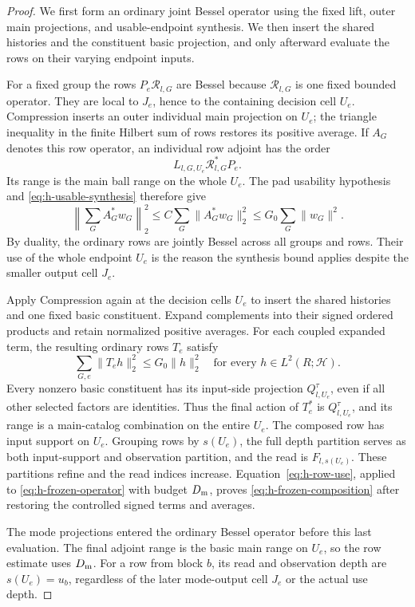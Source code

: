 \begin{proof}
We first form an ordinary joint Bessel operator using the fixed
lift, outer main projections, and usable-endpoint synthesis.
We then insert the shared histories and the constituent basic
projection, and only afterward evaluate the rows on their varying
endpoint inputs.

For a fixed group the rows \(P_e\mathcal R_{l,G}\) are Bessel
because \(\mathcal R_{l,G}\) is one fixed bounded operator.  They
are local to \(J_e\), hence to the containing decision cell
\(U_e\).  Compression inserts an outer individual main projection
on \(U_e\); the triangle inequality in the finite Hilbert sum of
rows restores its positive average.  If \(A_G\) denotes this row
operator, an individual row adjoint has the order
\[
 L_{l,G,U_e}\mathcal R_{l,G}^*P_e.
\]
Its range is the main ball range on the whole \(U_e\).  The pad
usability hypothesis and \eqref{eq:h-usable-synthesis} therefore
give
\[
 \left\|\sum_G A_G^*w_G\right\|_2^2
 \le C\sum_G\|A_G^*w_G\|_2^2
 \le G_0\sum_G\|w_G\|^2.
\]
By duality, the ordinary rows are jointly Bessel across all groups
and rows.  Their use of the whole endpoint \(U_e\) is the reason
the synthesis bound applies despite the smaller output cell \(J_e\).

Apply Compression again at the decision cells \(U_e\) to insert
the shared histories and one fixed basic constituent.  Expand
complements into their signed ordered products and retain
normalized positive averages.  For each coupled expanded term,
the resulting ordinary rows \(T_e\) satisfy
\begin{equation}
 \sum_{G,e}\|T_e h\|_2^2\le G_0\|h\|_2^2
 \quad\text{for every }h\in L^2(R;\mathcal H).
 \label{eq:h-frozen-operator}
\end{equation}
Every nonzero basic constituent has its input-side projection
\(Q^\tau_{l,U_e}\), even if all other selected factors are
identities.  Thus the final action of \(T_e^*\) is
\(Q^\tau_{l,U_e}\), and its range is a main-catalog combination
on the entire \(U_e\).  The composed row has input support on
\(U_e\).  Grouping rows by \(s(U_e)\), the full depth partition
serves as both input-support and observation partition, and the
read is \(F_{l,s(U_e)}\).  These partitions refine and the read
indices increase.  Equation~\eqref{eq:h-row-use}, applied to
\eqref{eq:h-frozen-operator} with budget \(D_{\rm m}\), proves
\eqref{eq:h-frozen-composition} after restoring the controlled
signed terms and averages.

The mode projections entered the ordinary Bessel operator before
this last evaluation.  The final adjoint range is the basic main
range on \(U_e\), so the row estimate uses \(D_{\rm m}\).  For a
row from block \(b\), its read and observation depth are
\(s(U_e)=u_b\), regardless of the later mode-output cell \(J_e\)
or the actual use depth.
\end{proof}

